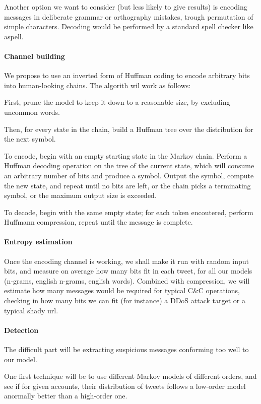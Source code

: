 \documentclass[a4paper,11pt]{article}
\begin{document}
Another option we want to consider (but less likely to give results) is encoding messages in deliberate grammar or orthography mistakes, trough permutation of simple characters. Decoding would be performed by a standard spell checker like aspell.

\paragraph{Channel building}

We propose to use an inverted form of Huffman coding to encode arbitrary bits into human-looking chains. The algorith wil work as follows:

First, prune the model to keep it down to a reasonable size, by excluding uncommon words.

Then, for every state in the chain, build a Huffman tree over the distribution for the next symbol.

To encode, begin with an empty starting state in the Markov chain. Perform a Huffman decoding operation on the tree of the current state, which will consume an arbitrary number of bits and produce a symbol. Output the symbol, compute the new state, and repeat until no bits are left, or the chain picks a terminating symbol, or the maximum output size is exceeded.

To decode, begin with the same empty state; for each token encoutered, perform Huffmann compression, repeat until the message is complete.

\paragraph{Entropy estimation}

Once the encoding channel is working, we shall make it run with random input bits, and measure on average how many bits fit in each tweet, for all our models (n-grams, english n-grams, english words). Combined with compression, we will estimate how many messages would be required for typical C\&C operations, checking in how many bits we can fit (for instance) a DDoS attack target or a typical shady url.

\paragraph{Detection}

The difficult part will be extracting suspicious messages conforming too well to our model. 

One first technique will be to use different Markov models of different orders, and see if for given accounts, their distribution of tweets follows a low-order model anormally better than a high-order one.
\end{document}
